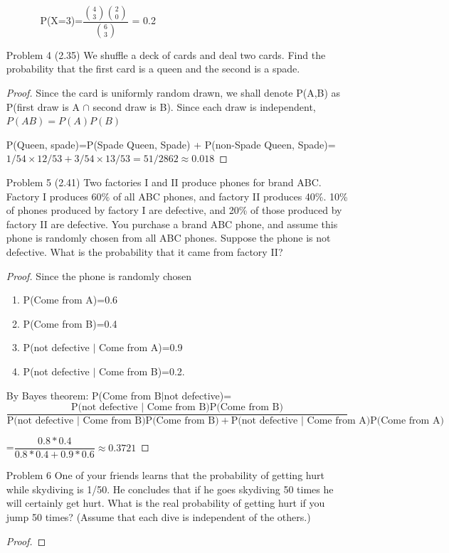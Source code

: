 \documentclass[11pt, oneside]{article}
\begin{document}
\begin{enumerate}
\begin{enumerate}
\begin{enumerate}
            P(X=3)=$\dfrac{{4\choose  3 } {2  \choose 0}}{{6\choose 3}}$ = 0.2
            
            \end{enumerate}
        \end{enumerate}
    
    
    \item [Problem 4]
    (2.35) We shuffle a deck of cards and deal two cards. Find the
    probability that the first card is a queen and the second is a spade.
    \begin{proof}
    Since the card is uniformly random drawn, we shall denote P(A,B) as P(first draw is A $\cap$ second draw is B). Since each draw is independent, $P(AB)=P(A)P(B)$
    
    P(Queen, spade)=P(Spade Queen, Spade) + P(non-Spade Queen, Spade)=$1/54 \times 12/53 + 3/54\times 13/53= 51/2862\approx 0.018$
    \end{proof}
    \item [Problem 5]
    (2.41) Two factories I and II produce phones for brand ABC. Factory I produces 60$\%$ of all ABC phones, and factory II produces 40\%. 10\% of phones produced by factory I are defective, and 20\% of those produced by factory II are defective. You purchase a brand ABC phone, and assume this phone is randomly chosen from all ABC phones. Suppose the phone is not defective. What is the probability that it came from factory II?
    \begin{proof}
    Since the phone is randomly chosen
    \begin{enumerate}
        \item P(Come from A)=0.6
        \item P(Come from B)=0.4
        \item P(not defective $|$ Come from A)=0.9
        \item P(not defective $|$ Come from B)=0.2.
    \end{enumerate}
    
   By Bayes theorem: P(Come from B$|$not defective)=
   \[\dfrac{\text{P(not defective $|$ Come from B)P(Come from B)}}{\text{P(not defective $|$ Come from B)P(Come from B)}+\text{P(not defective $|$ Come from A)P(Come from A)}}\]
   
   =$\dfrac{0.8*0.4}{0.8*0.4+0.9*0.6}\approx0.3721$
    \end{proof}
    
    \item [Problem 6]
    One of your friends learns that the probability of getting hurt while skydiving is 1/50. He concludes that if he goes skydiving 50 times he will certainly get hurt. What is the real probability of getting hurt if you jump 50 times? (Assume that each dive is independent of the others.)
    \begin{proof}
    

\end{proof}
\end{enumerate}
\end{document}
